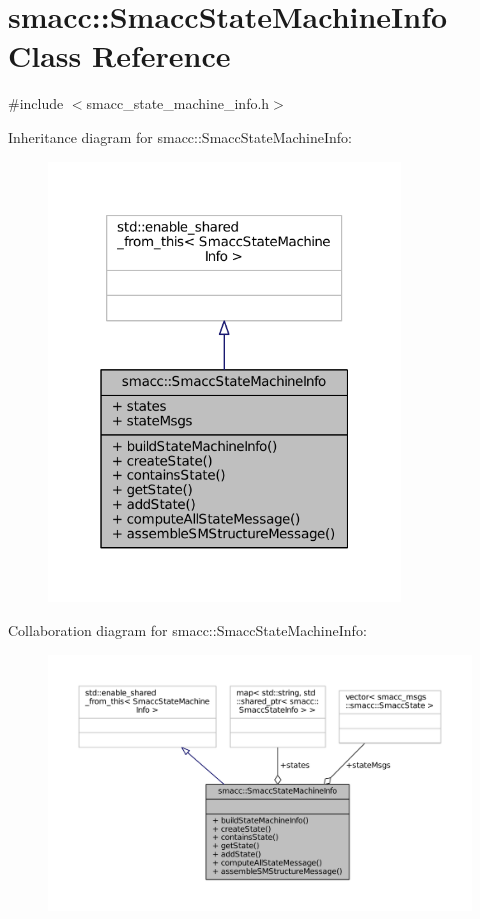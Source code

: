 \hypertarget{classsmacc_1_1SmaccStateMachineInfo}{}\section{smacc\+:\+:Smacc\+State\+Machine\+Info Class Reference}
\label{classsmacc_1_1SmaccStateMachineInfo}


{\ttfamily \#include $<$smacc\+\_\+state\+\_\+machine\+\_\+info.\+h$>$}



Inheritance diagram for smacc\+:\+:Smacc\+State\+Machine\+Info\+:
\nopagebreak
\begin{figure}[H]
\begin{center}
\leavevmode
\includegraphics[width=265pt]{classsmacc_1_1SmaccStateMachineInfo__inherit__graph}
\end{center}
\end{figure}


Collaboration diagram for smacc\+:\+:Smacc\+State\+Machine\+Info\+:
\nopagebreak
\begin{figure}[H]
\begin{center}
\leavevmode
\includegraphics[width=350pt]{classsmacc_1_1SmaccStateMachineInfo__coll__graph}
\end{center}
\end{figure}
